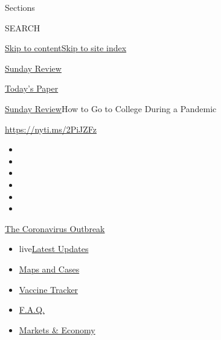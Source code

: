 Sections

SEARCH

\protect\hyperlink{site-content}{Skip to
content}\protect\hyperlink{site-index}{Skip to site index}

\href{https://www.nytimes.com/section/opinion/sunday}{Sunday Review}

\href{https://myaccount.nytimes.com/auth/login?response_type=cookie\&client_id=vi}{}

\href{https://www.nytimes.com/section/todayspaper}{Today's Paper}

\href{/section/opinion/sunday}{Sunday Review}\textbar{}How to Go to
College During a Pandemic

\href{https://nyti.ms/2PiJZFz}{https://nyti.ms/2PiJZFz}

\begin{itemize}
\item
\item
\item
\item
\item
\item
\end{itemize}

\href{https://www.nytimes.com/news-event/coronavirus?action=click\&pgtype=Article\&state=default\&region=TOP_BANNER\&context=storylines_menu}{The
Coronavirus Outbreak}

\begin{itemize}
\tightlist
\item
  live\href{https://www.nytimes.com/2020/08/08/world/coronavirus-updates.html?action=click\&pgtype=Article\&state=default\&region=TOP_BANNER\&context=storylines_menu}{Latest
  Updates}
\item
  \href{https://www.nytimes.com/interactive/2020/us/coronavirus-us-cases.html?action=click\&pgtype=Article\&state=default\&region=TOP_BANNER\&context=storylines_menu}{Maps
  and Cases}
\item
  \href{https://www.nytimes.com/interactive/2020/science/coronavirus-vaccine-tracker.html?action=click\&pgtype=Article\&state=default\&region=TOP_BANNER\&context=storylines_menu}{Vaccine
  Tracker}
\item
  \href{https://www.nytimes.com/interactive/2020/world/coronavirus-tips-advice.html?action=click\&pgtype=Article\&state=default\&region=TOP_BANNER\&context=storylines_menu}{F.A.Q.}
\item
  \href{https://www.nytimes.com/live/2020/08/07/business/stock-market-today-coronavirus?action=click\&pgtype=Article\&state=default\&region=TOP_BANNER\&context=storylines_menu}{Markets
  \& Economy}
\end{itemize}

